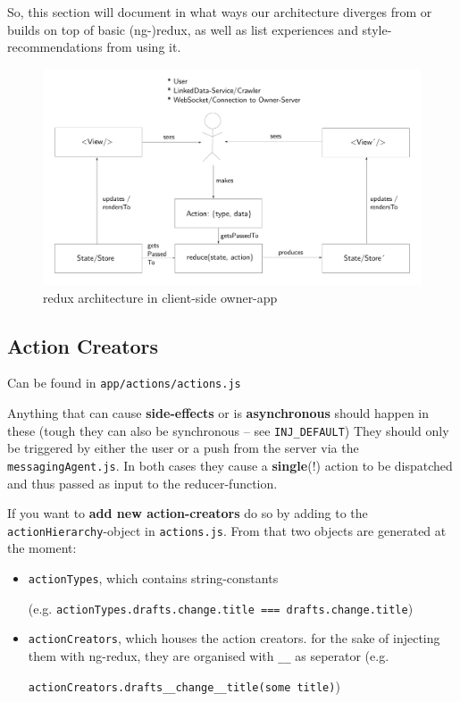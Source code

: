 So, this section will document in what ways our architecture diverges from or
builds on top of basic (ng-)redux, as well as list experiences and
style-recommendations from using it. %

\begin{figure}
\centering
\includegraphics[width=1.0\textwidth]{figures/owner_app_redux_architecture.pdf}
\caption{\label{fig:adapted-redux}redux architecture in client-side owner-app}
\end{figure}

\subsection{Action Creators}\label{sct:action-creators}

Can be found in \texttt{app/actions/actions.js} %

Anything that can cause \textbf{side-effects} or is
\textbf{asynchronous} should happen in these (tough they can also
be synchronous -- see \texttt{INJ\_DEFAULT}) %
They should only be triggered
by either the user or a push from the server via the
\texttt{messagingAgent.js}. In both cases they cause a
\textbf{single}(!) action to be dispatched and thus passed as
input to the reducer-function.

If you want to \textbf{add new action-creators} do so by adding to the
\texttt{actionHierarchy}-object in \texttt{actions.js}. %
From that two objects are generated at the moment:

\begin{itemize}
\tightlist
\item
  \texttt{actionTypes}, which contains string-constants

  (e.g.
  \texttt{actionTypes.drafts.change.title\ ===\
  \textquotesingle{}drafts.change.title\textquotesingle{}})
\item
  \texttt{actionCreators}, which houses the action creators. for the
  sake of injecting them with ng-redux, they are organised with
  \texttt{\_\_} as seperator (e.g.

  \texttt{actionCreators.drafts\_\_change\_\_title(\textquotesingle{}some\ title\textquotesingle{})})
\end{itemize}

